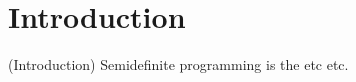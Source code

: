 


\chapter{Introduction}
\label{chap:Introduction}

(Introduction) Semidefinite programming is the etc etc.
